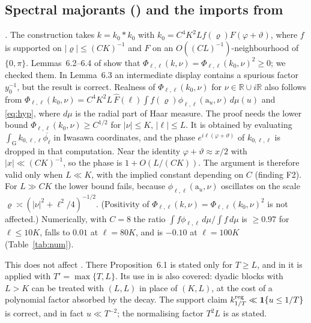 \documentclass[11pt]{amsart}
\theoremstyle{remark}
\theoremstyle{definition}
\numberwithin{equation}{section}
\newcommand{\R}{\mathbb{R}}
\newcommand{\G}{\mathrm{G}}
\newcommand{\one}{\mathbf{1}}
\newcommand{\ra}{\mathrm{a}}
\begin{document}
\subsection{Spectral majorants (\texorpdfstring{\cite[\S6]{GM1}}{[GM1, §6]}) and the imports from \texorpdfstring{\cite{GM0}}{[GM0]}}\label{sec:majorants}

\emph{\cite[Proposition~6.1]{GM0}.} The construction takes $k=k_0*k_0$ with $k_0=C^4K^2Lf(\varrho)F(\varphi+\vartheta)$, where $f$ is supported on $|\varrho|\le(CK)^{-1}$ and $F$ on an $O((CL)^{-1})$-neighbourhood of $\{0,\pi\}$. Lemmas~6.2--6.4 of \cite{GM0} show that $\Phi_{\ell,\ell}(k,\nu)=\Phi_{\ell,\ell}(k_0,\nu)^2\ge0$; we checked them. In Lemma~6.3 an intermediate display contains a spurious factor $y_0^{-1}$, but the result is correct. Realness of $\Phi_{\ell,\ell}(k_0,\nu)$ for $\nu\in\R\cup i\R$ also follows from $\Phi_{\ell,\ell}(k_0,\nu)=C^4K^2L\,\hat F(\ell)\int f(\varrho)\phi_{\ell,\ell}(\ra_u,\nu)\,d\mu(u)$ and \eqref{eq:hyp}, where $d\mu$ is the radial part of Haar measure. The proof needs the lower bound $\Phi_{\ell,\ell}(k_0,\nu)\ge C^{1/2}$ for $|\nu|\le K$, $|\ell|\le L$. It is obtained by evaluating $\int_\G k_{0,\ell,\ell}\overline{\phi_\ell}$ in Iwasawa coordinates, and the phase $e^{i\ell(\varphi+\vartheta)}$ of $k_{0,\ell,\ell}$ is dropped in that computation. Near the identity $\varphi+\vartheta\approx x/2$ with $|x|\ll(CK)^{-1}$, so the phase is $1+O(L/(CK))$. The argument is therefore valid only when $L\ll K$, with the implied constant depending on $C$ (finding F2). For $L\gg CK$ the lower bound fails, because $\phi_{\ell,\ell}(\ra_u,\nu)$ oscillates on the scale $\varrho\asymp(|\nu|^2+\ell^2/4)^{-1/2}$. (Positivity of $\Phi_{\ell,\ell}(k,\nu)=\Phi_{\ell,\ell}(k_0,\nu)^2$ is not affected.) Numerically, with $C=8$ the ratio $\int f\phi_{\ell,\ell}\,d\mu/\int f\,d\mu$ is $\ge0.97$ for $\ell\le10K$, falls to $0.01$ at $\ell=80K$, and is $-0.10$ at $\ell=100K$ (Table~\ref{tab:num}).

This does not affect \cite{GM1}. There Proposition~6.1 is stated only for $T\ge L$, and in \cite[\S7.4]{GM1} it is applied with $T'=\max\{T,L\}$. Its use in \cite[\S7.3]{GM0} is also covered: dyadic blocks with $L>K$ can be treated with $(L,L)$ in place of $(K,L)$, at the cost of a polynomial factor absorbed by the decay. The support claim $k^{\rm reg}_{1/T}\ll\one\{u\le1/T\}$ is correct, and in fact $u\ll T^{-2}$; the normalising factor $T^2L$ is as stated.
\end{document}
